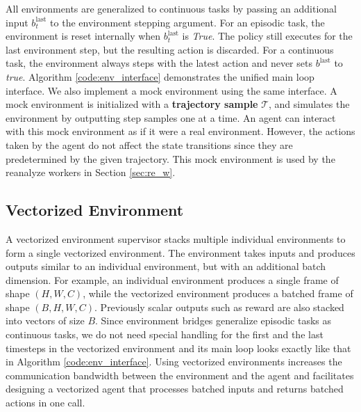 All environments are generalized to continuous tasks by passing an additional input $b^\text{last}_t$ to the environment stepping argument.
For an episodic task, the environment is reset internally when $b^{\text{last}}_t$ is \textit{True}.
The policy still executes for the last environment step, but the resulting action is discarded.
For a continuous task, the environment always steps with the latest action and never sets $b^\text{last}$ to \textit{true}.
Algorithm \ref{code:env_interface} demonstrates the unified main loop interface.
We also implement a mock environment \cite{MockObject__2021} using the same interface.
A mock environment is initialized with a \textbf{trajectory sample} $\mathcal{T}$, and simulates the environment by outputting step samples one at a time.
An agent can interact with this mock environment as if it were a real environment.
However, the actions taken by the agent do not affect the state transitions since they are predetermined by the given trajectory.
This mock environment is used by the reanalyze workers in Section \ref{sec:re_w}.


\subsection{Vectorized Environment} \label{sec:vec_env}
A vectorized environment supervisor stacks multiple individual environments to form a single vectorized environment.
The environment takes inputs and produces outputs similar to an individual environment, but with an additional batch dimension.
For example, an individual environment produces a single frame of shape $(H, W, C)$, while the vectorized environment produces a batched frame of shape $(B, H, W, C)$.
Previously scalar outputs such as reward are also stacked into vectors of size $B$.
Since environment bridges generalize episodic tasks as continuous tasks, we do not need special handling for the first and the last timesteps in the vectorized environment and its main loop looks exactly like that in Algorithm \ref{code:env_interface}.
Using vectorized environments increases the communication bandwidth between the environment and the agent and facilitates designing a vectorized agent that processes batched inputs and returns batched actions in one call.

